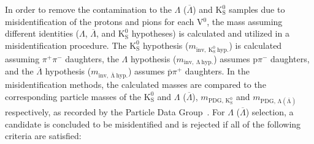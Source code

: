 \documentclass[ALICE,manyauthors]{cernphprep}
\newcommand{\Lam}{$\Lambda$\xspace}
\newcommand{\ALam}{$\overline{\Lambda}$\xspace}
\newcommand{\LamALam}{$\Lambda$ ($\overline{\Lambda}$)\xspace}
\newcommand{\Ks}{$\mathrm{K^{0}_{S}}$\xspace}
\newcommand{\Vz}{V$^{0}$\xspace}
\providecommand{\DIFaddtex}[1]{{\protect\color{blue}\uwave{#1}}} %
\providecommand{\DIFdeltex}[1]{{\protect\color{red}\sout{#1}}}                      %
\providecommand{\DIFaddbegin}{} %
\providecommand{\DIFaddend}{} %
\providecommand{\DIFdelbegin}{} %
\providecommand{\DIFdelend}{} %
\providecommand{\DIFadd}[1]{\texorpdfstring{\DIFaddtex{#1}}{#1}} %
\providecommand{\DIFdel}[1]{\texorpdfstring{\DIFdeltex{#1}}{}} %
\begin{document}
\begin{comment}
In order to remove the contamination to the \LamALam and \Ks samples due to misidentification of the protons and pions for each \Vz, the mass assuming different identities (\Lam, \ALam, \Ks)\footnote[1]
{
For the misidentification cuts, the mass assuming \Ks hypothesis ($m_{\mathrm{inv,~ K^{0}_{S}~ hyp.}}$) is calculated assuming \DIFdelbegin \DIFdel{$\pi^{+}\pi^{-}$ }\DIFdelend \DIFaddbegin \DIFadd{$\uppi^{+}\uppi^{-}$ }\DIFaddend daughters, the mass assuming \Lam hypothesis ($m_{\mathrm{inv,~ \Lambda~ hyp.}}$) is calculated assuming p\DIFdelbegin \DIFdel{$\pi^{-}$ }\DIFdelend \DIFaddbegin \DIFadd{$\uppi^{-}$ }\DIFaddend daughters, and the mass assuming \ALam hypothesis ($m_{\mathrm{inv,~ \overline{\Lambda}~ hyp.}}$) is calculated assuming \DIFdelbegin \DIFdel{$\overline{\mathrm{p}}\pi^{+}$ }\DIFdelend \DIFaddbegin \DIFadd{$\overline{\mathrm{p}}\uppi^{+}$ }\DIFaddend daughters. 
Additionally, $m_{\mathrm{PDG,\,K^{0}_{S}}}$ and $m_{\mathrm{PDG,\,\Lambda(\overline{\Lambda})}}$ denote the particle masses of the \Ks and \LamALam, respectively, as recorded by the Particle Data Group~\cite{PhysRevD.98.030001}.
}
is calculated and utilized in a set of misidentification cuts.
For \LamALam selection, a candidate is assumed to be misidentified and is rejected if all of the following criteria are satisfied:
\end{comment}

In order to remove the contamination to the \LamALam and \Ks samples due to misidentification of the protons and pions for each \Vz, the mass assuming different identities (\Lam, \ALam, and \Ks hypotheses) is calculated and utilized in a misidentification procedure.
The \Ks hypothesis ($m_{\mathrm{inv,~ K^{0}_{S}~ hyp.}}$) is calculated assuming \DIFdelbegin \DIFdel{$\pi^{+}\pi^{-}$ }\DIFdelend \DIFaddbegin \DIFadd{$\uppi^{+}\uppi^{-}$ }\DIFaddend daughters, the \Lam hypothesis ($m_{\mathrm{inv,~ \Lambda~ hyp.}}$) assumes p\DIFdelbegin \DIFdel{$\pi^{-}$ }\DIFdelend \DIFaddbegin \DIFadd{$\uppi^{-}$ }\DIFaddend daughters, and the \ALam hypothesis ($m_{\mathrm{inv,~ \overline{\Lambda}~ hyp.}}$) assumes \DIFdelbegin \DIFdel{$\overline{\mathrm{p}}\pi^{+}$ }\DIFdelend \DIFaddbegin \DIFadd{$\overline{\mathrm{p}}\uppi^{+}$ }\DIFaddend daughters. 
In the misidentification methods, the calculated masses are compared to the corresponding particle masses of the \Ks and \LamALam, $m_{\mathrm{PDG,\,K^{0}_{S}}}$ and $m_{\mathrm{PDG,\,\Lambda(\overline{\Lambda})}}$ respectively, as recorded by the Particle Data Group~\cite{PhysRevD.98.030001}.
For \LamALam selection, a candidate is concluded to be misidentified and is rejected if all of the following criteria are satisfied:
\end{document}
